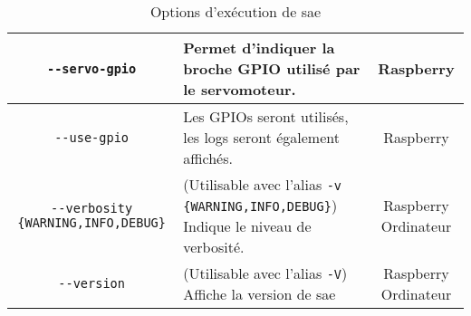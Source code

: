 \begin{table}[H]
\begin{tabularx}{\linewidth}{|c|X|c|}
        \texttt{-{}-servo-gpio}                       & Permet d'indiquer la broche GPIO utilisé par le servomoteur.                                                                                               & Raspberry            \\\hline
        \texttt{-{}-use-gpio}                         & Les GPIOs seront utilisés, les logs seront également affichés.                                                                                             & Raspberry            \\\hline
        \texttt{-{}-verbosity \{WARNING,INFO,DEBUG\}} & (Utilisable avec l'alias \texttt{-v \{WARNING,INFO,DEBUG\}}) Indique le niveau de verbosité.                                                               & Raspberry Ordinateur \\\hline
        \texttt{-{}-version}                          & (Utilisable avec l'alias \texttt{-V}) Affiche la version de \gls{sae}                                                                                      & Raspberry Ordinateur \\\hline
    \end{tabularx}
    \label{tabOptClearway}
    \caption{Options d'exécution de \gls{sae}}
\end{table}


